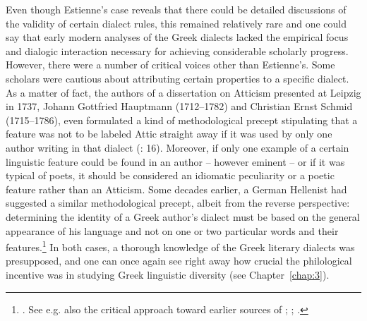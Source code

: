 Even though Estienne’s case reveals that there could be detailed discussions of the validity of certain dialect rules, this remained relatively rare and one could say that early modern analyses of the Greek dialects lacked the empirical focus and dialogic interaction necessary for achieving considerable scholarly progress. However, there were a number of critical voices other than Estienne’s. Some scholars were cautious about attributing certain properties to a specific dialect. As a matter of fact, the authors of a dissertation on Atticism presented at Leipzig in 1737, Johann Gottfried Hauptmann (1712–1782) and Christian Ernst Schmid (1715–1786), even formulated a kind of methodological precept stipulating that a feature was not to be labeled Attic straight away if it was used by only one author writing in that dialect (\citealt{Hauptmann1737}: 16). Moreover, if only one example of a certain linguistic feature could be found in an author – however eminent – or if it was typical of poets, it should be considered an idiomatic peculiarity or a poetic feature rather than an Atticism. Some decades earlier, a German Hellenist had suggested a similar methodological precept, albeit from the reverse perspective: determining the identity of a Greek author’s dialect must be based on the general appearance of his language and not on one or two particular words and their features.\footnote{\citet[495--496]{Ursin1691}. See e.g. also the critical approach toward earlier sources of \citet{Walper1589}; \citet[{\scriptsize{)(}}.3\textsc{\textsuperscript{r}})]{Portus1603}; \citet[10-12]{Gedike1782}.} In both cases, a thorough knowledge of the Greek literary dialects was presupposed, and one can once again see right away how crucial the philological incentive was in studying Greek linguistic diversity (see Chapter~\ref{chap:3}).

